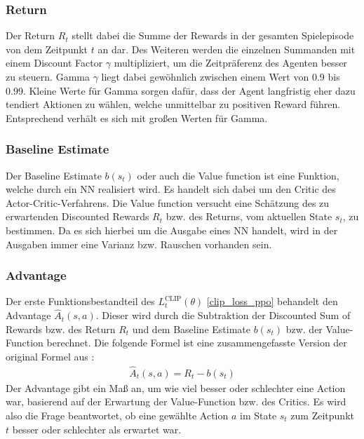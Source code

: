 \subsubsection{Return} \label{sec:Return}
Der Return $R_{t}$ stellt dabei die Summe der Rewards in der gesamten Spielepisode von dem Zeitpunkt $t$ an dar. Des Weiteren werden die einzelnen Summanden mit einem Discount Factor $\gamma$ multipliziert, um die Zeitpräferenz des Agenten besser zu steuern. Gamma $\gamma$ liegt dabei gewöhnlich zwischen einem Wert von 0.9 bis 0.99. Kleine Werte für Gamma sorgen dafür, dass der Agent langfristig eher dazu tendiert Aktionen zu wählen, welche unmittelbar zu positiven Reward führen. Entsprechend verhält es sich mit großen Werten für Gamma. \cite[S. 42 ff.]{Sutton1998}

\subsubsection{Baseline Estimate} \label{sec:Baseline_Estimate}
Der Baseline Estimate $b(s_{t})$ oder auch die Value function ist eine Funktion, welche durch ein NN realisiert wird. Es handelt sich dabei um den Critic des Actor-Critic-Verfahrens. Die Value function versucht eine Schätzung des zu erwartenden Discounted Rewards $R_{t}$ bzw. des Returns, vom aktuellen State $s_{t}$, zu bestimmen. Da es sich hierbei um die Ausgabe eines NN handelt, wird in der Ausgaben immer eine Varianz bzw. Rauschen vorhanden sein. \cite[Kapitel 3]{asynchronous_methods_for_deep_rl}

\subsubsection{Advantage} \label{sec:Advantages}
Der erste Funktionsbestandteil des $L^\text{CLIP}_{t} (\theta)$ \ref{clip_loss_ppo} behandelt den Advantage $\hat{A}_{t}(s, a)$. Dieser wird durch die Subtraktion der Discounted Sum of Rewards bzw. des Return $R_{t}$ und dem Baseline Estimate $b(s_{t})$ bzw. der Value-Function berechnet. Die folgende Formel ist eine zusammengefasste Version der original Formel aus \cite{PPO}:
\begin{align}
	\hat{A}_{t}(s, a) = R_{t} - b(s_{t})
\end{align}
Der Advantage gibt ein Maß an, um wie viel besser oder schlechter eine Action war, basierend auf der Erwartung der Value-Function bzw. des Critics. Es wird also die Frage beantwortet, ob eine gewählte Action $a$ im State $s_{t}$ zum Zeitpunkt $t$ besser oder schlechter als erwartet war. \cite[Kapitel 3]{asynchronous_methods_for_deep_rl}


